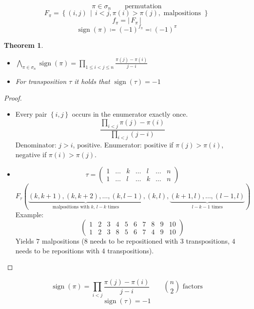 \documentclass[a4paper,landscape,twocolumn]{article}
\newcommand\set[1]{\left\{#1\right\}}
\newcommand\setdef[2]{\left\{#1\,\middle|\,#2\right\}}
\newcommand\card[1]{\left|\,#1\,\right|}
\newtheorem{theorem}{Theorem}
\DeclareMathOperator\sign{sign}
\begin{document}
\[ \pi \in \sigma_n \qquad \text{permutation} \]
\[ F_\pi = \setdef{(i,j)}{i < j, \pi(i) > \pi(j), \text{ malpositions }} \]
\[ f_\pi = \card{F_\pi} \]
\[ \sign(\pi) \coloneqq (-1)^{f_\pi} \eqqcolon (-1)^\pi \]

\begin{theorem}
  \label{satz-7.16}
  \begin{itemize}
    \item $\bigwedge_{\pi \in \sigma_n} \sign(\pi) = \prod_{1 \leq i < j \leq n} \frac{\pi(j) - \pi(i)}{j - i}$
    \item For transposition $\tau$ it holds that $\sign(\tau) = -1$
  \end{itemize}
\end{theorem}
\begin{proof}
  \begin{itemize}
    \item
      Every pair $\set{i,j}$ occurs in the enumerator exactly once.
      \[ \frac{\prod_{i<j} \pi(j) - \pi(i)}{\prod_{i<j} (j - i)} \]
      Denominator: $j > i$, positive.
      Enumerator: positive if $\pi(j) > \pi(i)$, negative if $\pi(i) > \pi(j)$.
    \item
      \[
        \tau =
        \begin{pmatrix}
          1 & \ldots & k & \ldots & l & \ldots & n \\
          1 & \ldots & l & \ldots & k & \ldots & n
        \end{pmatrix}
      \] \[
        F_\tau(\underbrace{(k, k + 1), (k, k + 2), \ldots, (k, l-1)}_{\text{malpositions with $k$, $l-k$ times}},
        (k,l), \underbrace{(k+1, l), \ldots, (l - 1, l)}_{l-k-1 \text{ times}})
      \]
      Example:
      \[
        \begin{pmatrix}
          1 & 2 & 3 & 4 & 5 & 6 & 7 & 8 & 9 & 10 \\
          1 & 2 & 3 & 8 & 5 & 6 & 7 & 4 & 9 & 10
        \end{pmatrix}
      \]
      Yields $7$ malpositions ($8$ needs to be repositioned with 3 transpositions, $4$ needs to be repositions with 4 transpositions).
  \end{itemize}
\end{proof}

\[ \sign(\pi) = \prod_{i < j} \frac{\pi(j) - \pi(i)}{j - i} \qquad {n \choose 2} \text{ factors} \]
\[ \sign(\tau) = -1 \]
\end{document}
